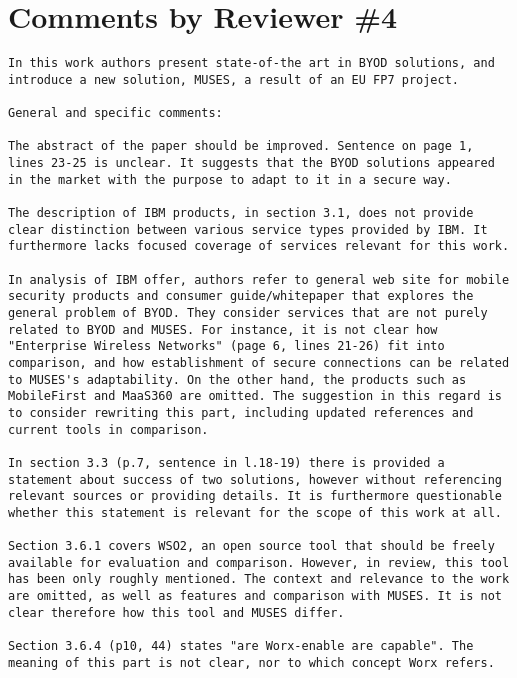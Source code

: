 \documentclass[preprint]{elsarticle}
\begin{document}
\section{Comments by Reviewer \#4}

\begin{verbatim}
In this work authors present state-of-the art in BYOD solutions, and introduce a new solution, MUSES, a result of an EU FP7 project.

General and specific comments:

The abstract of the paper should be improved. Sentence on page 1, lines 23-25 is unclear. It suggests that the BYOD solutions appeared in the market with the purpose to adapt to it in a secure way.

The description of IBM products, in section 3.1, does not provide clear distinction between various service types provided by IBM. It furthermore lacks focused coverage of services relevant for this work.

In analysis of IBM offer, authors refer to general web site for mobile security products and consumer guide/whitepaper that explores the general problem of BYOD. They consider services that are not purely related to BYOD and MUSES. For instance, it is not clear how "Enterprise Wireless Networks" (page 6, lines 21-26) fit into comparison, and how establishment of secure connections can be related to MUSES's adaptability. On the other hand, the products such as MobileFirst and MaaS360 are omitted. The suggestion in this regard is to consider rewriting this part, including updated references and current tools in comparison.

In section 3.3 (p.7, sentence in l.18-19) there is provided a statement about success of two solutions, however without referencing relevant sources or providing details. It is furthermore questionable whether this statement is relevant for the scope of this work at all.

Section 3.6.1 covers WSO2, an open source tool that should be freely available for evaluation and comparison. However, in review, this tool has been only roughly mentioned. The context and relevance to the work are omitted, as well as features and comparison with MUSES. It is not clear therefore how this tool and MUSES differ.

Section 3.6.4 (p10, 44) states "are Worx-enable are capable". The meaning of this part is not clear, nor to which concept Worx refers.


\end{verbatim}
\end{document}
